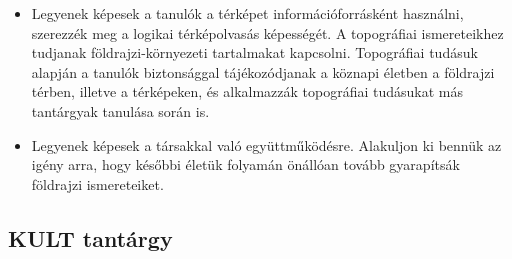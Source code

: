 \begin{itemize}
\item Legyenek képesek a tanulók a térképet információforrásként használni, szerezzék meg a logikai térképolvasás képességét. A topográfiai ismereteikhez tudjanak földrajzi-környezeti tartalmakat kapcsolni. Topográfiai tudásuk alapján a tanulók biztonsággal tájékozódjanak a köznapi életben a földrajzi térben, illetve a térképeken, és alkalmazzák topográfiai tudásukat más tantárgyak tanulása során is.
\item Legyenek képesek a társakkal való együttműködésre. Alakuljon ki bennük az igény arra, hogy későbbi életük folyamán önállóan tovább gyarapítsák földrajzi ismereteiket.
\end{itemize}
\subsection{KULT tantárgy}
